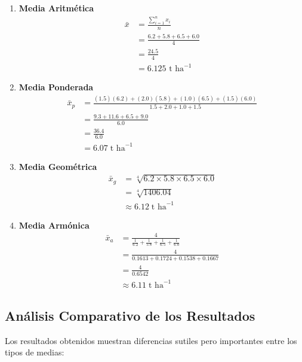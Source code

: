 \documentclass[
  spanish,
  letterpaper,
]{book}
\begin{document}
\begin{enumerate}
\def\labelenumi{\arabic{enumi}.}
\item
  \textbf{Media Aritmética} \[\begin{aligned}
  \bar{x} &= \frac{\sum_{i=1}^{n} x_i}{n} \\[4pt]
  &= \frac {6.2+5.8+6.5+6.0}{4} \\[4pt]  &= \frac {24.5}{4} \\[4pt]  &=6.125 \text{ t ha}^{-1}
  \end{aligned}\]
\item
  \textbf{Media Ponderada} \[\begin{aligned}
  \bar{x}_p &= \frac{(1.5)(6.2) + (2.0)(5.8) + (1.0)(6.5) + (1.5)(6.0)}{1.5 + 2.0 + 1.0 + 1.5} \\[4pt]
        &= \frac{9.3 + 11.6 + 6.5 + 9.0}{6.0} \\[4pt]
        &= \frac{36.4}{6.0} \\[4pt]
        &= 6.07\; \text{t ha}^{-1}
  \end{aligned}\]
\item
  \textbf{Media Geométrica} \[\begin{aligned}
  \bar{x}_g &= \sqrt[4]{6.2 \times 5.8 \times 6.5 \times 6.0} \\[4pt]
        &= \sqrt[4]{1406.04} \\[4pt]
        &\approx 6.12\; \text{t ha}^{-1}
  \end{aligned}\]
\item
  \textbf{Media Armónica} \[\begin{aligned}
  \bar{x}_a &= \frac{4}{\frac{1}{6.2} + \frac{1}{5.8} + \frac{1}{6.5} + \frac{1}{6.0}} \\[4pt]
        &= \frac{4}{0.1613 + 0.1724 + 0.1538 + 0.1667} \\[4pt]
        &= \frac{4}{0.6542} \\[4pt]
        &\approx 6.11\; \text{t ha}^{-1}
  \end{aligned}\]
\end{enumerate}

\subsection{Análisis Comparativo de los
Resultados}\label{anuxe1lisis-comparativo-de-los-resultados}

Los resultados obtenidos muestran diferencias sutiles pero importantes
entre los tipos de medias:
\end{document}
